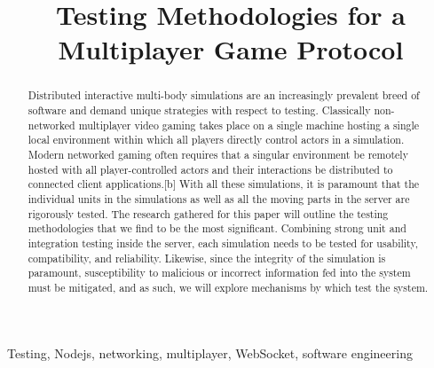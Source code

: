 \documentclass[conference]{IEEEtran}
\begin{document}
\title{Testing Methodologies for a Multiplayer Game Protocol\\
}

\author{
}

\maketitle

\begin{abstract}
 Distributed interactive multi-body simulations are an increasingly prevalent breed of software and demand unique strategies with respect to testing. 
 Classically non-networked multiplayer video gaming takes place on a single machine hosting a single local environment within which all players directly 
 control actors in a simulation. Modern networked gaming often requires that a singular environment be remotely hosted with all player-controlled actors and 
 their interactions be distributed to connected client applications.[b] With all these simulations, it is paramount that the individual units in the simulations 
 as well as all the moving parts in the server are rigorously tested. The research gathered for this paper will outline the testing methodologies that we find 
 to be the most significant. Combining strong unit and integration testing inside the server, each simulation needs to be tested for usability, compatibility, and 
 reliability. Likewise, since the integrity of the simulation is paramount, susceptibility to malicious or incorrect information fed into the system  must be mitigated, 
 and as such, we will explore mechanisms by which test the system.


\end{abstract}

\begin{IEEEkeywords}
Testing, Nodejs, networking, multiplayer, WebSocket, software engineering
\end{IEEEkeywords}
\end{document}
